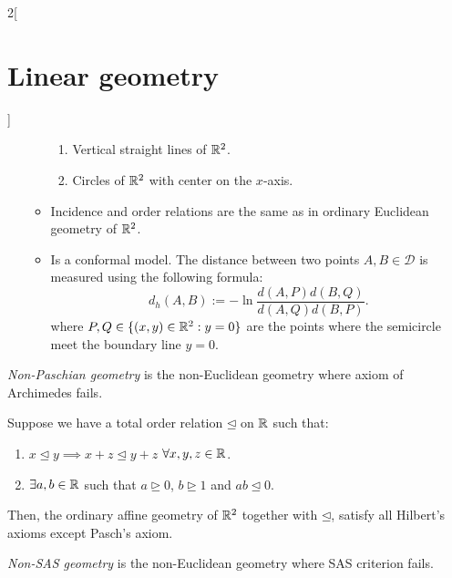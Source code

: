 \documentclass[../../../main.tex]{subfiles}
\begin{document}
\begin{multicols}{2}[\section{Linear geometry}]
\begin{definition}
\begin{itemize}
\begin{itemize}
\begin{enumerate}
                                \item Vertical straight lines of $\mathbb{R}^2$.
                                \item Circles of $\mathbb{R}^2$ with center on the $x$-axis.
                            \end{enumerate}
                      \item Incidence and order relations are the same as in ordinary Euclidean geometry of $\mathbb{R}^2$.
                      \item Is a conformal model. The distance between two points $A,B\in\mathcal{D}$ is measured using the following formula: $$d_h(A,B):=-\ln\frac{d(A,P)d(B,Q)}{d(A,Q)d(B,P)}.$$ where $P,Q\in\{(x,y)\in\mathbb{R}^2:y=0\}$ are the points where the semicircle meet the boundary line $y=0$.
                  \end{itemize}
                  \begin{center}
                      \begin{minipage}{\linewidth}
                          \centering
                          
                      \end{minipage}
                  \end{center}
        \end{itemize}
    \end{definition}
    \begin{definition}
        \textit{Non-Paschian geometry} is the non-Euclidean geometry where axiom of Archimedes fails.
    \end{definition}
    \begin{prop}
        Suppose we have a total order relation $\unlhd$ on $\mathbb{R} $ such that:
        \begin{enumerate}
            \item $x\unlhd y\implies x+z\unlhd y+z$ $\forall x,y,z\in\mathbb{R} $.
            \item $\exists a,b\in\mathbb{R}$ such that $a\unrhd 0$, $b\unrhd 1$ and $ab\unlhd 0$.
        \end{enumerate}
        Then, the ordinary affine geometry of $\mathbb{R}^2$ together with $\unlhd$, satisfy all Hilbert's axioms except Pasch's axiom.
    \end{prop}
    \begin{definition}
        \textit{Non-SAS geometry} is the non-Euclidean geometry where SAS criterion fails.

\end{definition}
\end{multicols}
\end{document}
